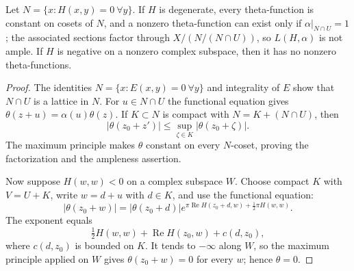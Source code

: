 \begin{proposition}
\label{mumford-source-theta-degenerate}
Let $N=\{x:H(x,y)=0\ \forall y\}$.  If $H$ is degenerate, every
theta-function is constant on cosets of $N$, and a nonzero theta-function can
exist only if $\alpha|_{N\cap U}=1$; the associated sections factor through
$X/(N/(N\cap U))$, so $L(H,\alpha)$ is not ample.  If $H$ is negative on a
nonzero complex subspace, then it has no nonzero theta-functions.
\end{proposition}
\begin{proof}
The identities $N=\{x:E(x,y)=0\ \forall y\}$ and integrality of $E$ show
that $N\cap U$ is a lattice in $N$.  For $u\in N\cap U$ the functional
equation gives $\theta(z+u)=\alpha(u)\theta(z)$.  If $K\subset N$ is compact
with $N=K+(N\cap U)$, then
\[
 |\theta(z_0+z')|\leq\sup_{\zeta\in K}|\theta(z_0+\zeta)|.
\]
The maximum principle makes $\theta$ constant on every $N$-coset, proving
the factorization and the ampleness assertion.

Now suppose $H(w,w)<0$ on a complex subspace $W$.  Choose compact $K$ with
$V=U+K$, write $w=d+u$ with $d\in K$, and use the functional equation:
\[
 |\theta(z_0+w)|=|\theta(z_0+d)|
 e^{\pi\operatorname{Re}H(z_0+d,w)+\frac12\pi H(w,w)}.
\]
The exponent equals
\[
 \tfrac12H(w,w)+\operatorname{Re}H(z_0,w)+c(d,z_0),
\]
where $c(d,z_0)$ is bounded on $K$.  It tends to $-\infty$ along $W$, so
the maximum principle applied on $W$ gives $\theta(z_0+w)=0$ for every $w$;
hence $\theta=0$.
\end{proof}

